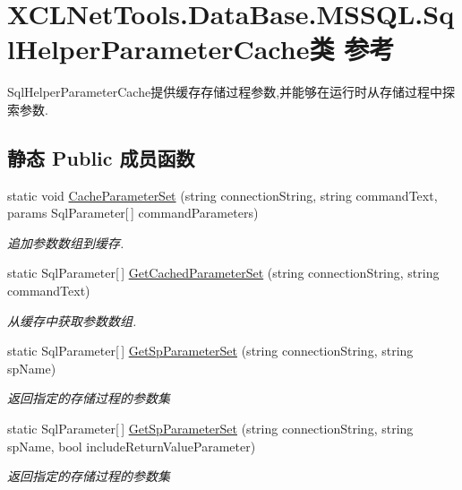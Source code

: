 \hypertarget{class_x_c_l_net_tools_1_1_data_base_1_1_m_s_s_q_l_1_1_sql_helper_parameter_cache}{}\section{X\+C\+L\+Net\+Tools.\+Data\+Base.\+M\+S\+S\+Q\+L.\+Sql\+Helper\+Parameter\+Cache类 参考}
\label{class_x_c_l_net_tools_1_1_data_base_1_1_m_s_s_q_l_1_1_sql_helper_parameter_cache}


Sql\+Helper\+Parameter\+Cache提供缓存存储过程参数,并能够在运行时从存储过程中探索参数.  


\subsection*{静态 Public 成员函数}
\begin{DoxyCompactItemize}
\item 
static void \hyperlink{class_x_c_l_net_tools_1_1_data_base_1_1_m_s_s_q_l_1_1_sql_helper_parameter_cache_a4c9d3ea3efdc1a0c29c522ad7fde1900}{Cache\+Parameter\+Set} (string connection\+String, string command\+Text, params Sql\+Parameter\mbox{[}$\,$\mbox{]} command\+Parameters)
\begin{DoxyCompactList}\small\item\em 追加参数数组到缓存. \end{DoxyCompactList}\item 
static Sql\+Parameter\mbox{[}$\,$\mbox{]} \hyperlink{class_x_c_l_net_tools_1_1_data_base_1_1_m_s_s_q_l_1_1_sql_helper_parameter_cache_a6003ff6a4a36764733a6487d083458b7}{Get\+Cached\+Parameter\+Set} (string connection\+String, string command\+Text)
\begin{DoxyCompactList}\small\item\em 从缓存中获取参数数组. \end{DoxyCompactList}\item 
static Sql\+Parameter\mbox{[}$\,$\mbox{]} \hyperlink{class_x_c_l_net_tools_1_1_data_base_1_1_m_s_s_q_l_1_1_sql_helper_parameter_cache_a58ac469fef0b1bfbe5d246c29d04a885}{Get\+Sp\+Parameter\+Set} (string connection\+String, string sp\+Name)
\begin{DoxyCompactList}\small\item\em 返回指定的存储过程的参数集 \end{DoxyCompactList}\item 
static Sql\+Parameter\mbox{[}$\,$\mbox{]} \hyperlink{class_x_c_l_net_tools_1_1_data_base_1_1_m_s_s_q_l_1_1_sql_helper_parameter_cache_a7890bc8805a1a41b5934963c58d98771}{Get\+Sp\+Parameter\+Set} (string connection\+String, string sp\+Name, bool include\+Return\+Value\+Parameter)
\begin{DoxyCompactList}\small\item\em 返回指定的存储过程的参数集 \end{DoxyCompactList}\end{DoxyCompactItemize}


